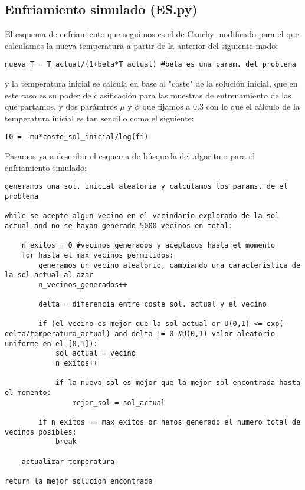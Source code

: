 \documentclass[10pt,a4paper]{article}
\begin{document}
\newpage
\subsection{\color[rgb]{0.0,0.0,0.51}Enfriamiento simulado (ES.py)}

El esquema de enfriamiento que seguimos es el de Cauchy modificado para el que calculamos la nueva temperatura a partir de la anterior del siguiente modo:\\

\begin{lstlisting}
nueva_T = T_actual/(1+beta*T_actual) #beta es una param. del problema
\end{lstlisting}

y la temperatura inicial se calcula en base al "coste" de la solución inicial, que en este caso es su poder de clasificación para las muestras de entrenamiento de las que partamos, y dos parámtros $\mu$ y $\phi$ que fijamos a 0.3 con lo que el cálculo de la temperatura inicial es tan sencillo como el siguiente:\\

\begin{lstlisting}
T0 = -mu*coste_sol_inicial/log(fi)
\end{lstlisting}

Pasamos ya a describir el esquema de búsqueda del algoritmo para el enfriamiento simulado:\\

\begin{lstlisting}
generamos una sol. inicial aleatoria y calculamos los params. de el problema

while se acepte algun vecino en el vecindario explorado de la sol actual and no se hayan generado 5000 vecinos en total:

	n_exitos = 0 #vecinos generados y aceptados hasta el momento
	for hasta el max_vecinos permitidos:
		generamos un vecino aleatorio, cambiando una caracteristica de la sol actual al azar
		n_vecinos_generados++
		
		delta = diferencia entre coste sol. actual y el vecino
		
		if (el vecino es mejor que la sol actual or U(0,1) <= exp(-delta/temperatura_actual) and delta != 0 #U(0,1) valor aleatorio uniforme en el [0,1]):
			sol actual = vecino
			n_exitos++
		
			if la nueva sol es mejor que la mejor sol encontrada hasta el momento:
				mejor_sol = sol_actual
			
		if n_exitos == max_exitos or hemos generado el numero total de vecinos posibles:
			break
			
	actualizar temperatura	
	
return la mejor solucion encontrada
\end{lstlisting}
\end{document}
